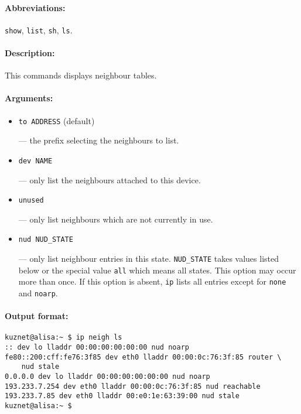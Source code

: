 \paragraph{Abbreviations:} \verb|show|, \verb|list|, \verb|sh|, \verb|ls|.

\paragraph{Description:}This commands displays neighbour tables.

\paragraph{Arguments:}

\begin{itemize}

\item \verb|to ADDRESS| (default)

--- the prefix selecting the neighbours to list.

\item \verb|dev NAME|

--- only list the neighbours attached to this device.

\item \verb|unused|

--- only list neighbours which are not currently in use.

\item \verb|nud NUD_STATE|

--- only list neighbour entries in this state. \verb|NUD_STATE| takes
values listed below or the special value \verb|all| which means all states.
This option may occur more than once. If this option is absent, \verb|ip|
lists all entries except for \verb|none| and \verb|noarp|.

\end{itemize}


\paragraph{Output format:}

\begin{verbatim}
kuznet@alisa:~ $ ip neigh ls
:: dev lo lladdr 00:00:00:00:00:00 nud noarp
fe80::200:cff:fe76:3f85 dev eth0 lladdr 00:00:0c:76:3f:85 router \
    nud stale
0.0.0.0 dev lo lladdr 00:00:00:00:00:00 nud noarp
193.233.7.254 dev eth0 lladdr 00:00:0c:76:3f:85 nud reachable
193.233.7.85 dev eth0 lladdr 00:e0:1e:63:39:00 nud stale
kuznet@alisa:~ $ 
\end{verbatim}

